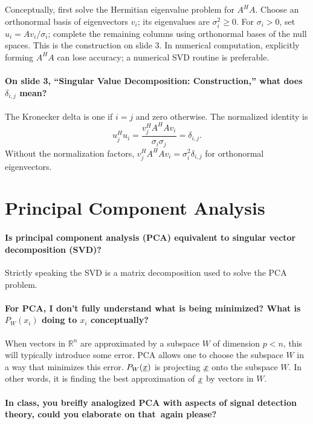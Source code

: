 \documentclass[10pt,english]{article}
\begin{document}
Conceptually, first solve the Hermitian eigenvalue problem for $A^H A$.
Choose an orthonormal basis of eigenvectors $v_i$; its eigenvalues are $\sigma_i^2\geq0$.
For $\sigma_i>0$, set $u_i=Av_i/\sigma_i$; complete the remaining columns using orthonormal bases of the null spaces.
This is the construction on slide 3. In numerical computation, explicitly forming $A^H A$ can lose accuracy; a numerical SVD routine is preferable.


\paragraph{On slide 3, ``Singular Value Decomposition: Construction,'' what does $\delta_{i,j}$ mean?}
The Kronecker delta is one if $i=j$ and zero otherwise.
The normalized identity is
\[
u_j^H u_i=\frac{v_j^H A^H A v_i}{\sigma_i\sigma_j}=\delta_{i,j}.
\]
Without the normalization factors, $v_j^H A^H A v_i=\sigma_i^2\delta_{i,j}$ for orthonormal eigenvectors.

\section{Principal Component Analysis}

\paragraph{Is principal component analysis (PCA) equivalent to singular vector decomposition (SVD)?}

Strictly speaking the SVD is a matrix decomposition used to solve the PCA problem.

\paragraph{For PCA, I don't fully understand what is being minimized? What is $P_W(x_i)$ doing to $x_i$ conceptually?}

When vectors in $\mathbb{R}^n$ are approximated by a subspace $W$ of dimension $p<n$, this will typically introduce some error.
PCA allows one to choose the subspace $W$ in a way that minimizes this error.
$P_W (\underline{x})$ is projecting $\underline{x}$ onto the subspace $W$.
In other words, it is finding the best approximation of $\underline{x}$ by vectors in $W$.

\paragraph{In class, you breifly analogized PCA with aspects of signal detection theory, could you elaborate on that again please?}
\end{document}
